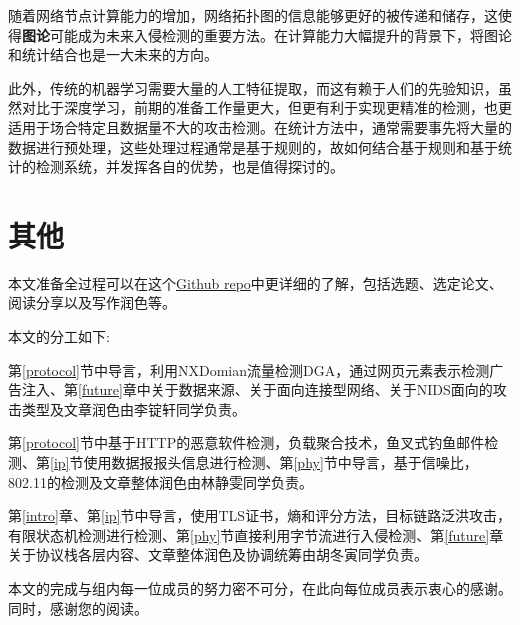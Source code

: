 \documentclass[12pt]{article} %
\begin{document}
随着网络节点计算能力的增加，网络拓扑图的信息能够更好的被传递和储存，这使得\textbf{图论}可能成为未来入侵检测的重要方法。在计算能力大幅提升的背景下，将图论和统计结合也是一大未来的方向。

此外，传统的机器学习需要大量的人工特征提取，而这有赖于人们的先验知识，虽然对比于深度学习，前期的准备工作量更大，但更有利于实现更精准的检测，也更适用于场合特定且数据量不大的攻击检测。在统计方法中，通常需要事先将大量的数据进行预处理，这些处理过程通常是基于规则的，故如何结合基于规则和基于统计的检测系统，并发挥各自的优势，也是值得探讨的。
\section{其他}
\label{other}

本文准备全过程可以在这个\href{https://github.com/Voivio/Network-Security-Protocol-project}{Github repo}中更详细的了解，包括选题、选定论文、阅读分享以及写作润色等。

本文的分工如下:

第\ref{protocol}节中导言，利用NXDomian流量检测DGA，通过网页元素表示检测广告注入、第\ref{future}章中关于数据来源、关于面向连接型网络、关于NIDS面向的攻击类型及文章润色由李锭轩同学负责。

第\ref{protocol}节中基于HTTP的恶意软件检测，负载聚合技术，鱼叉式钓鱼邮件检测、第\ref{ip}节使用数据报报头信息进行检测、第\ref{phy}节中导言，基于信噪比，802.11的检测及文章整体润色由林静雯同学负责。

第\ref{intro}章、第\ref{ip}节中导言，使用TLS证书，熵和评分方法，目标链路泛洪攻击，有限状态机检测进行检测、第\ref{phy}节直接利用字节流进行入侵检测、第\ref{future}章关于协议栈各层内容、文章整体润色及协调统筹由胡冬寅同学负责。

本文的完成与组内每一位成员的努力密不可分，在此向每位成员表示衷心的感谢。同时，感谢您的阅读。
\end{document}
